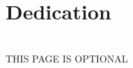 \documentclass[./dissertation.tex]{subfiles}
\begin{document}
  \chapter*{Dedication}

  \lipsum[7]\\

  THIS PAGE IS OPTIONAL
\end{document}
